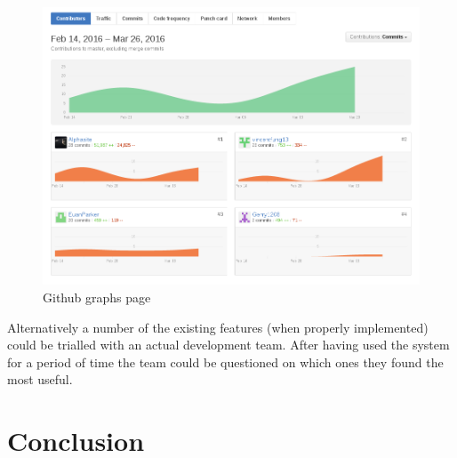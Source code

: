 \documentclass{l4proj}
\begin{document}
\begin{figure}[h]
\includegraphics[scale = 0.7]{github-example.png}
\centering
\caption{Github graphs page}
\label{fig:14}
\end{figure}

Alternatively a number of the existing features (when properly implemented) could be trialled with an actual development team.  After having used the system for a period of time the team could be questioned on which ones they found the most useful.  
\chapter{Conclusion}

\begin{appendices}


\end{appendices}




\end{document}
